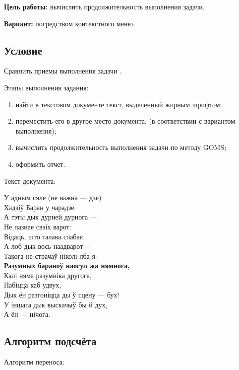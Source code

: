 \documentclass{bsuir}
\begin{document}
\maketitle
\mainmatter

\textbf{Цель работы:}
вычислить продолжительность выполнения задачи.

\textbf{Вариант:}
посредством контекстного меню.

\subsection{Условие}

Сравнить приемы выполнения задачи .

Этапы выполнения задания:

\begin{enumerate}
	\item
	      найти в текстовом документе текст, выделенный жирным шрифтом;
	\item
	      переместить его в другое место документа: (в соответствии с вариантом
	      выполнения);
	\item
	      вычислить продолжительность выполнения задачи по методу GOMS;
	\item
	      оформить отчет.
\end{enumerate}

Текст документа:

\begin{center}
	У адным сяле (не важна — дзе) \\
	Хадзіў Баран у чарадзе. \\
	А гэты дык дурней дурнога — \\
	Не пазнае сваіх варот: \\
	Відаць, што галава слабая. \\
	А лоб дык вось наадварот — \\
	Такога не страчаў ніколі лба я: \\
	\textbf{Разумных бараноў наогул жа нямнога,} \\
	Калі няма разумніка другога, \\
	Пабіцца каб удвух, \\
	Дык ён разгоніцца ды ў сцену — бух! \\
	У іншага дык выскачыў бы й дух, \\
	А ён — нічога.
\end{center}


\subsection{Алгоритм подсчёта}
Алгоритм переноса:
\end{document}
